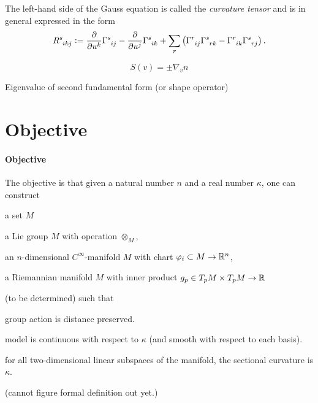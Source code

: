 \documentclass[stu, babel, american, biblatex, a4paper, leqno, draftall]{apa7}
\begin{document}
\begin{remark}\label{Manifold:CurvatureTensor:ChristoffelSymbol}
    The left-hand side of the Gauss equation is called the \textit{curvature tensor}
    and is in general expressed in the form
    \begin{equation*}
        \tensor{R}{^s_i_k_j}
        \defeq
        \frac{\partial}{\partial\tensor{u}{^k}}\tensor{\Gamma}{^s_i_j}
        - \frac{\partial}{\partial\tensor{u}{^j}}\tensor{\Gamma}{^s_i_k}
        + \sum_{r}\left(\tensor{\Gamma}{^r_i_j}\tensor{\Gamma}{^s_r_k}-\tensor{\Gamma}{^r_i_k}\tensor{\Gamma}{^s_r_j}\right) \text{.}
    \end{equation*}
\end{remark}

\begin{example}\label{ShapeOperator}
    $$S\left(v\right)=\pm\nabla_v n$$
\end{example}
\begin{example}\label{PrincipalCurvature}
    Eigenvalue of second fundamental form (or shape operator)
\end{example}

\section{Objective}
\paragraph{Objective}\label{Objective}
The objective is that
given a natural number $n$ and a real number $\kappa$,
one can construct
\begin{APAenumerate}
    \item a set $M$
    \item a Lie group $M$ with operation $\otimes_M$,
    \item an $n$-dimensional $C^\infty$-manifold $M$ with chart $\varphi_i \subset M\to\mathbb{R}^n$,
    \item a Riemannian manifold $M$ with inner product $g_p\in T_pM\times T_pM\to\mathbb{R}$
\end{APAenumerate}
(to be determined)
such that
\begin{APAitemize}
    \item group action is distance preserved.
    \item model is continuous with respect to $\kappa$ (and smooth with respect to each basis).
    \item for all two-dimensional linear subspaces of the manifold, the sectional curvature is $\kappa$.
\end{APAitemize}
(cannot figure formal definition out yet.)
\end{document}
